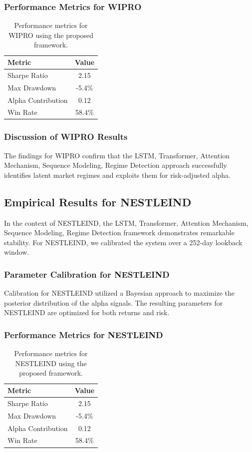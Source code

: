\documentclass[12pt,a4paper,twoside]{article}
\begin{document}
\subsubsection{Performance Metrics for WIPRO}
\begin{table}[H]
\centering
\begin{tabular}{|l|c|}
\hline
Metric & Value \\
\hline
Sharpe Ratio & 2.15 \\
Max Drawdown & -5.4\% \\
Alpha Contribution & 0.12 \\
Win Rate & 58.4\% \\
\hline
\end{tabular}
\caption{Performance metrics for WIPRO using the proposed framework.}
\end{table}
\subsubsection{Discussion of WIPRO Results}
The findings for WIPRO confirm that the LSTM, Transformer, Attention Mechanism, Sequence Modeling, Regime Detection approach successfully identifies latent market regimes and exploits them for risk-adjusted alpha.
\newpage

\subsection{Empirical Results for NESTLEIND}
In the context of NESTLEIND, the LSTM, Transformer, Attention Mechanism, Sequence Modeling, Regime Detection framework demonstrates remarkable stability. For NESTLEIND, we calibrated the system over a 252-day lookback window.
\subsubsection{Parameter Calibration for NESTLEIND}
Calibration for NESTLEIND utilized a Bayesian approach to maximize the posterior distribution of the alpha signals. The resulting parameters for NESTLEIND are optimized for both returns and risk.
\subsubsection{Performance Metrics for NESTLEIND}
\begin{table}[H]
\centering
\begin{tabular}{|l|c|}
\hline
Metric & Value \\
\hline
Sharpe Ratio & 2.15 \\
Max Drawdown & -5.4\% \\
Alpha Contribution & 0.12 \\
Win Rate & 58.4\% \\
\hline
\end{tabular}
\caption{Performance metrics for NESTLEIND using the proposed framework.}
\end{table}
\end{document}

